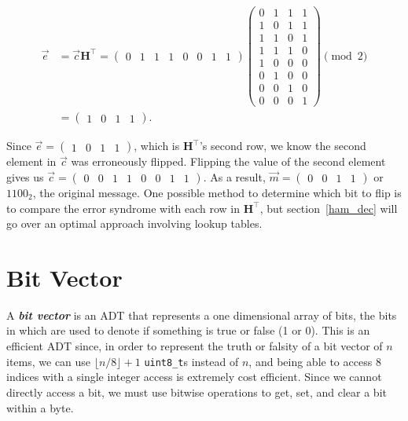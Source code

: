 \documentclass[11pt]{article}
\begin{document}
\begin{align*}
    \Vec{e} &=\Vec{c}\boldsymbol{H^{\intercal}} =\begin{pmatrix}0 & 1 & 1 & 1 & 0 & 0 & 1 & 1\end{pmatrix}
    \begin{pmatrix}
         0 & 1 & 1 & 1 \\
         1 & 0 & 1 & 1 \\
         1 & 1 & 0 & 1 \\
         1 & 1 & 1 & 0 \\
         1 & 0 & 0 & 0 \\
         0 & 1 & 0 & 0 \\
         0 & 0 & 1 & 0 \\
         0 & 0 & 0 & 1
    \end{pmatrix} \pmod{2} \\
    &= \begin{pmatrix}1 & 0 & 1 & 1 \end{pmatrix}.
\end{align*}

\noindent Since $\Vec{e} = \begin{pmatrix}1 & 0 & 1 & 1 \end{pmatrix}$,
which is $\boldsymbol{H}^\intercal$'s second row, we know the second
element in $\Vec{c}$ was erroneously flipped. Flipping the value of the
second element gives us $\Vec{c} = \begin{pmatrix}0 & 0 & 1 & 1 & 0 & 0
& 1 & 1\end{pmatrix}$.  As a result, $\Vec{m} = \begin{pmatrix}0 & 0 & 1
& 1\end{pmatrix}$ or $1100_2$, the original message. One possible method
to determine which bit to flip is to compare the error syndrome with
each row in $\boldsymbol{H}^\intercal$, but section~\ref{ham_dec} will go over
an optimal approach involving lookup tables.

\section{Bit Vector}

A \textit{\textbf{bit vector}} is an ADT that represents a one
dimensional array of bits, the bits in which are used to denote if
something is true or false (1 or 0). This is an efficient ADT since, in
order to represent the truth or falsity of a bit vector of $n$ items, we
can use $\lfloor{n / 8}\rfloor + 1$ \texttt{uint8\_t}s instead of $n$,
and being able to access $8$ indices with a single integer access is
extremely cost efficient. Since we cannot directly access a bit, we must
use bitwise operations to get, set, and clear a bit within a byte.
\end{document}
